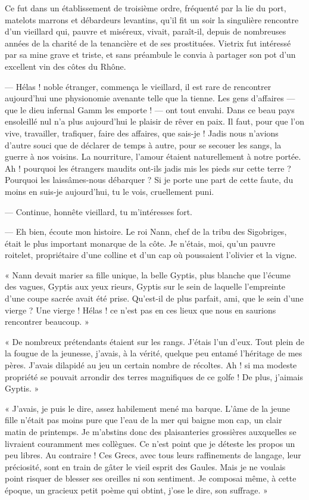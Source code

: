 \documentclass[a4paper, 11pt, oneside, polutonikogreek, french]{article}
\begin{document}
Ce fut dans un établissement de troisième ordre, fréquenté par la lie du port, matelots marrons et débardeurs levantins, qu'il fit un soir la singulière rencontre d'un vieillard qui, pauvre et miséreux, vivait, paraît-il, depuis de nombreuses années de la charité de la tenancière et de ses prostituées. Vietrix fut intéressé par sa mine grave et triste, et sans préambule le convia à partager son pot d'un excellent vin des côtes du Rhône.

\bigskip
\centerline{\EightStarTaper}
\centerline{\EightStarTaper\EightStarTaper}
\bigskip

--- Hélas ! noble étranger, commença le vieillard, il est rare de rencontrer aujourd'hui une physionomie avenante telle que la tienne. Les gens d'affaires --- que le dieu infernal Gamm les emporte ! --- ont tout envahi. Dans ce beau pays ensoleillé nul n'a plus aujourd'hui le plaisir de rêver en paix. Il faut, pour que l'on vive, travailler, trafiquer, faire des affaires, que sais-je ! Jadis nous n'avions d'autre souci que de déclarer de temps à autre, pour se secouer les sangs, la guerre à nos voisins. La nourriture, l'amour étaient naturellement à notre portée. Ah ! pourquoi les étrangers maudits ont-ils jadis mis les pieds sur cette terre ? Pourquoi les laissâmes-nous débarquer ? Si je porte une part de cette faute, du moins en suis-je aujourd'hui, tu le vois, cruellement puni.

--- Continue, honnête vieillard, tu m'intéresses fort.

--- Eh bien, écoute mon histoire. Le roi Nann, chef de la tribu des Sigobriges, était le plus important monarque de la côte. Je n'étais, moi, qu'un pauvre roitelet, propriétaire d'une colline et d'un cap où poussaient l'olivier et la vigne.

« Nann devait marier sa fille unique, la belle Gyptis, plus blanche que l'écume des vagues, Gyptis aux yeux rieurs, Gyptis sur le sein de laquelle l'empreinte d'une coupe sacrée avait été prise. Qu'est-il de plus parfait, ami, que le sein d'une vierge ? Une vierge ! Hélas ! ce n'est pas en ces lieux que nous en saurions rencontrer beaucoup. »

« De nombreux prétendants étaient sur les rangs. J'étais l'un d'eux. Tout plein de la fougue de la jeunesse, j'avais, à la vérité, quelque peu entamé l'héritage de mes pères. J'avais dilapidé au jeu un certain nombre de récoltes. Ah ! si ma modeste propriété se pouvait arrondir des terres magnifiques de ce golfe ! De plus, j'aimais Gyptis. »

« J'avais, je puis le dire, assez habilement mené ma barque. L'âme de la jeune fille n'était pas moins pure que l'eau de la mer qui baigne mon cap, un clair matin de printemps. Je m'abstins donc des plaisanteries grossières auxquelles se livraient couramment mes collègues. Ce n'est point que je déteste les propos un peu libres. Au contraire ! Ces Grecs, avec tous leurs raffinements de langage, leur préciosité, sont en train de gâter le vieil esprit des Gaules. Mais je ne voulais point risquer de blesser ses oreilles ni son sentiment. Je composai même, à cette époque, un gracieux petit poème qui obtint, j'ose le dire, son suffrage. »
\end{document}

